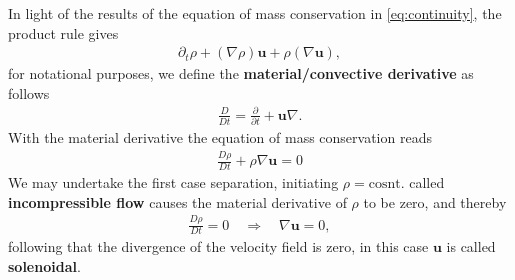 In light of the results of the equation of mass conservation
in \ref{eq:continuity}, the product rule gives
\begin{align}
    \partial_t \rho + (\nabla \rho)\mathbf{u} + \rho(\nabla \mathbf{u}),
\end{align}
for notational purposes, we define the \textbf{material/convective derivative}
as follows
\begin{align}
    \frac{D}{Dt} = \frac{\partial }{\partial t}  + \mathbf{u}\nabla.
\end{align}
With the material derivative the equation of mass conservation reads
\begin{align}
    \frac{D\rho}{Dt} + \rho \nabla\mathbf{u} = 0
\end{align}
We may undertake the first case separation, initiating $\rho = \text{cosnt.}$
called \textbf{incompressible flow} causes the material derivative of $\rho$ to
be zero, and thereby
\begin{align}
    \frac{D\rho}{Dt} = 0 \quad \Rightarrow \quad \nabla \mathbf{u} = 0,
\end{align}
following that the divergence of the velocity field is zero, in this case
$\mathbf{u}$ is called \textbf{solenoidal}.
